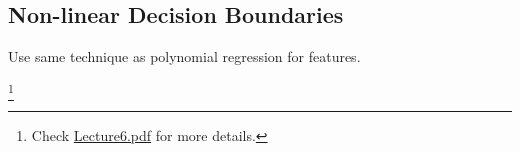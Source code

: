 \documentclass[a4paper, 12pt]{report}
\newcommand\blfootnote[1]{
	\begingroup
	\renewcommand\thefootnote{}\footnote{#1}
	\addtocounter{footnote}{-1}
	\endgroup
}
\begin{document}
\subsection*{Non-linear Decision Boundaries}
Use same technique as polynomial regression for features.

\blfootnote{Check \href{lecture_pdf/Lecture6.pdf}{Lecture6.pdf} for more details.}

\begin{appendices}
\end{appendices}
\end{document}
